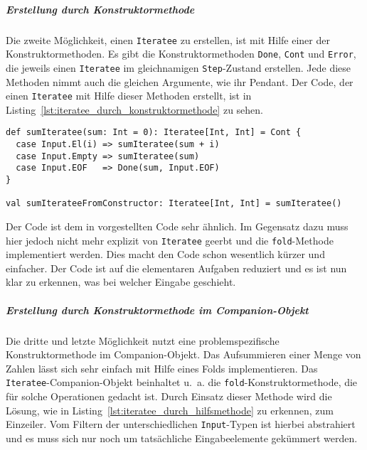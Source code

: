 \documentclass[draft=false
              ,paper=a4
              ,twoside=false
              ,fontsize=11pt
              ,headsepline
              ,BCOR10mm
              ,DIV11
              ]{scrbook}
\begin{document}
\subparagraph{Erstellung durch Konstruktormethode} %
\label{subp:erstellung_durch_konstruktormethode}\mbox{} %

Die zweite Möglichkeit, einen \lstinline|Iteratee| zu erstellen, ist mit Hilfe einer der Konstruktormethoden.
Es gibt die Konstruktormethoden \lstinline|Done|, \lstinline|Cont| und \lstinline|Error|, die jeweils einen \lstinline|Iteratee| im gleichnamigen \lstinline|Step|-Zustand erstellen.
Jede diese Methoden nimmt auch die gleichen Argumente, wie ihr Pendant.
Der Code, der einen \lstinline|Iteratee| mit Hilfe dieser Methoden erstellt, ist in Listing~\ref{lst:iteratee_durch_konstruktormethode} zu sehen.

\begin{lstlisting}[caption=Erstellung eines Iteratees durch eine Konstruktormethode, label=lst:iteratee_durch_konstruktormethode]
def sumIteratee(sum: Int = 0): Iteratee[Int, Int] = Cont {
  case Input.El(i) => sumIteratee(sum + i)
  case Input.Empty => sumIteratee(sum)
  case Input.EOF   => Done(sum, Input.EOF)
}

val sumIterateeFromConstructor: Iteratee[Int, Int] = sumIteratee()
\end{lstlisting}

Der Code ist dem in  vorgestellten Code sehr ähnlich.
Im Gegensatz dazu muss hier jedoch nicht mehr explizit von \lstinline|Iteratee| geerbt und die \lstinline|fold|-Methode implementiert werden.
Dies macht den Code schon wesentlich kürzer und einfacher.
Der Code ist auf die elementaren Aufgaben reduziert und es ist nun klar zu erkennen, was bei welcher Eingabe geschieht.


\subparagraph{Erstellung durch Konstruktormethode im Companion-Objekt} %
\label{subp:erstellung_durch_konstruktormethode_im_companion_objekt}\mbox{} %

Die dritte und letzte Möglichkeit nutzt eine problemspezifische Konstruktormethode im Companion-Objekt.
Das Aufsummieren einer Menge von Zahlen lässt sich sehr einfach mit Hilfe eines Folds implementieren.
Das \lstinline|Iteratee|-Companion-Objekt beinhaltet u.~a. die \lstinline|fold|-Konstruktormethode, die für solche Operationen gedacht ist.
Durch Einsatz dieser Methode wird die Lösung, wie in Listing~\ref{lst:iteratee_durch_hilfsmethode} zu erkennen, zum Einzeiler.
Vom Filtern der unterschiedlichen \lstinline|Input|-Typen ist hierbei abstrahiert und es muss sich nur noch um tatsächliche Eingabeelemente gekümmert werden.
\end{document}
